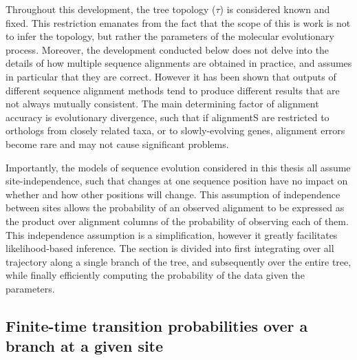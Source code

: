 Throughout this development, the tree topology ($\tau$) is considered known and fixed.
This restriction emanates from the fact that the scope of this is work is not to infer the topology, but rather the parameters of the molecular evolutionary process.
Moreover, the development conducted below does not delve into the details of how multiple sequence alignments are obtained in practice, and assumes in particular that they are correct.
However it has been shown that outputs of different sequence alignment methods tend to produce different results that are not always mutually consistent.
The main determining factor of alignment accuracy is evolutionary divergence, such that if alignmentS are restricted to orthologs from closely related taxa, or to slowly-evolving genes, alignment errors become rare and may not cause significant problems.

Importantly, the models of sequence evolution considered in this thesis all assume site-independence, such that changes at one sequence position have no impact on whether and how other positions will change.
This assumption of independence between sites allows the probability of an observed alignment to be expressed as the product over alignment columns of the probability of observing each of them.
This independence assumption is a simplification, however it greatly facilitates likelihood-based inference.
The section is divided into first integrating over all trajectory along a single branch of the tree, and subsequently over the entire tree, while finally efficiently computing the probability of the data given the parameters.

\subsection{Finite-time transition probabilities over a branch at a given site}

